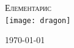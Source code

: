 \begin{titlepage}
\begin{center}

\textsc{\Huge Елементарис}\\[1.5cm]
\texttt{[image: dragon]}~
\\[1cm]

\vfill

\scriptsize \today \normalsize

\end{center}
\end{titlepage}
